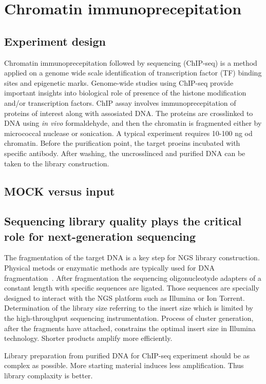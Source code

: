 \chapter{Chromatin immunoprecepitation}
\section{Experiment design}
Chromatin immunoprecepitation followed by sequencing (ChIP-seq) is a method applied on a genome wide scale identification of transcription factor (TF) binding sites and epigenetic marks.
Genome-wide studies using ChIP-seq provide important insights into biological role of presence of the histone modification and/or transcription factors.
ChIP assay involves immunoprecepitation of proteins of interest along with assosiated DNA.
The proteins are crosslinked to DNA using  \emph{in vivo} formaldehyde, and then the chromatin is fragmented either by micrococcal nuclease or sonication.
A typical experiment requires 10-100 ng od chromatin.
Before the purification point, the target proeins incubated with specific antibody.
After washing, the uncrosslinced and purified DNA can be taken to the library construction.

\section{MOCK versus input}


\section{Sequencing library quality plays the critical role for next-generation sequencing}
The fragmentation of the target DNA is a key step for NGS library construction.
Physical metods or enzymatic methods are typically used for DNA fragmentation~\cite{}.
After fragmentation the sequencing oligonucleotyde adapters of a constant length with specific sequences are ligated.
Those sequences are specially designed to interact with the NGS platform such as Illumina or Ion Torrent.
Determination of the library size referring to the insert size which is limited by the high-throughput sequencing instrumentation.
Process of cluster generation, after the fragments have attached, constrains the optimal insert size in Illumina technology.
Shorter products amplify more efficiently.

Library preparation from purified DNA for ChIP-seq experiment should be as complex as possible.
More starting material induces less amplification.
Thus library complaxity is better.



